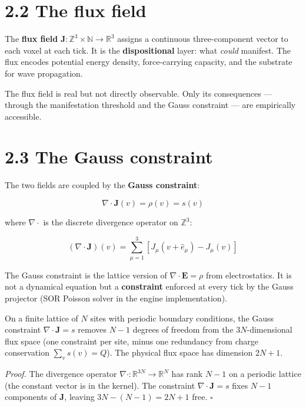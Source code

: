 \documentclass[
  11pt,
  letterpaper,
  twoside,
  openright]{book}
\begin{document}
\section{2.2 The flux field}\label{the-flux-field}

The \textbf{flux field}
\(\mathbf{J} : \mathbb{Z}^3 \times \mathbb{N} \to \mathbb{R}^3\) assigns
a continuous three-component vector to each voxel at each tick. It is
the \textbf{dispositional} layer: what \emph{could} manifest. The flux
encodes potential energy density, force-carrying capacity, and the
substrate for wave propagation.

The flux field is real but not directly observable. Only its
consequences --- through the manifestation threshold and the Gauss
constraint --- are empirically accessible.

\section{2.3 The Gauss constraint}\label{sec-gauss}

The two fields are coupled by the \textbf{Gauss constraint}:

\[
\nabla \cdot \mathbf{J}(v) = \rho(v) = s(v)
\tag{2.1}
\]

where \(\nabla \cdot\) is the discrete divergence operator on
\(\mathbb{Z}^3\):

\[
(\nabla \cdot \mathbf{J})(v) = \sum_{\mu = 1}^{3} \left[ J_\mu(v + \hat{e}_\mu) - J_\mu(v) \right]
\]

The Gauss constraint is the lattice version of
\(\nabla \cdot \mathbf{E} = \rho\) from electrostatics. It is not a
dynamical equation but a \textbf{constraint} enforced at every tick by
the Gauss projector (SOR Poisson solver in the engine implementation).

\begin{ftdtheorem}

On a finite lattice of \(N\) sites with periodic boundary conditions,
the Gauss constraint \(\nabla \cdot \mathbf{J} = s\) removes \(N - 1\)
degrees of freedom from the \(3N\)-dimensional flux space (one
constraint per site, minus one redundancy from charge conservation
\(\sum_v s(v) = Q\)). The physical flux space has dimension \(2N + 1\).

\end{ftdtheorem}

\emph{Proof.} The divergence operator
\(\nabla \cdot : \mathbb{R}^{3N} \to \mathbb{R}^N\) has rank \(N - 1\)
on a periodic lattice (the constant vector is in the kernel). The
constraint \(\nabla \cdot \mathbf{J} = s\) fixes \(N - 1\) components of
\(\mathbf{J}\), leaving \(3N - (N-1) = 2N + 1\) free. \(\square\)
\end{document}

